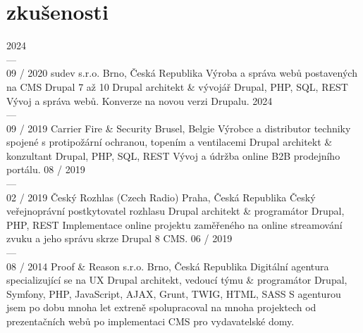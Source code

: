 \documentclass[]{friggeri-cv} %
\begin{document}

\bigskip

\section{zkušenosti}
\begin{entrylist}
  \job
  {2024 \\ --- \\ 09 / 2020}
  {sudev s.r.o.}
  {Brno, Česká Republika}
  {Výroba a správa webů postavených na CMS Drupal 7 až 10}
  {
    \position
    {Drupal architekt \& vývojář}
    {Drupal, PHP, SQL, REST}
    {
      Vývoj a správa webů. Konverze na novou verzi Drupalu.
    }
  }
  \job
  {2024 \\ --- \\ 09 / 2019}
  {Carrier Fire \& Security}
  {Brusel, Belgie}
  {Výrobce a distributor techniky spojené s protipožární ochranou, topením a ventilacemi}
  {
    \position
      {Drupal architekt \& konzultant}
      {Drupal, PHP, SQL, REST}
      {
        Vývoj a údržba online B2B prodejního portálu.
      }
  }
  \job
  {08 / 2019 \\ --- \\ 02 / 2019}
  {Český Rozhlas (Czech Radio)}
  {Praha, Česká Republika}
  {Český veřejnoprávní postkytovatel rozhlasu}
  {
    \position
      {Drupal architekt \& programátor}
      {Drupal, PHP, REST}
      {
        Implementace online projektu zaměřeného na online streamování zvuku a jeho správu skrze Drupal 8 CMS.
      }
  }
  \job
  {06 / 2019 \\ --- \\ 08 / 2014}
  {Proof \& Reason s.r.o.}
  {Brno, Česká Republika}
  {Digitální agentura specializující se na UX}
  {
    \position
      {Drupal architekt, vedoucí týmu \& programátor}
      {Drupal, Symfony, PHP, JavaScript, AJAX, Grunt, TWIG, HTML, SASS}
      {
        S agenturou jsem po dobu mnoha let extreně spolupracoval na mnoha projektech od prezentačních webů po implementaci CMS
        pro vydavatelské domy.
      }
  }
\end{entrylist}
\end{document}
